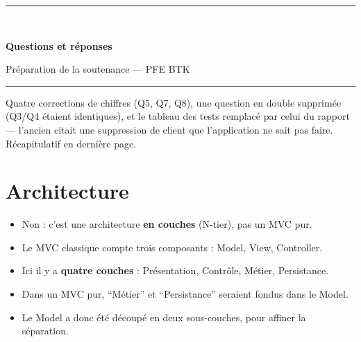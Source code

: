\documentclass[a4paper,11pt]{article}
\begin{document}
\begin{center}
{\color{btkblue}\rule{\textwidth}{2pt}}\\[0.3cm]
{\huge\bfseries\color{btkblue} Questions et réponses\par}
\vspace{0.2cm}
{\large Préparation de la soutenance --- PFE BTK\par}
\vspace{0.2cm}
{\color{btkblue}\rule{\textwidth}{2pt}}
\end{center}

\vspace{0.4cm}
\begin{corrige}[title={Version vérifiée --- ce qui a changé}]
Quatre corrections de chiffres (Q5, Q7, Q8), une question en double supprimée
(Q3/Q4 étaient identiques), et le tableau des tests remplacé par celui du
rapport --- l'ancien citait une suppression de client que l'application ne sait
pas faire. Récapitulatif en dernière page.
\end{corrige}

\section{Architecture}


\begin{itemize}[leftmargin=*,itemsep=1pt]
  \item Non : c'est une architecture \textbf{en couches} (N-tier), pas un MVC pur.
  \item Le MVC classique compte trois composants : Model, View, Controller.
  \item Ici il y a \textbf{quatre couches} : Présentation, Contrôle, Métier, Persistance.
  \item Dans un MVC pur, \enquote{Métier} et \enquote{Persistance} seraient fondus dans le Model.
  \item Le Model a donc été découpé en deux sous-couches, pour affiner la séparation.
\end{itemize}

\end{document}

